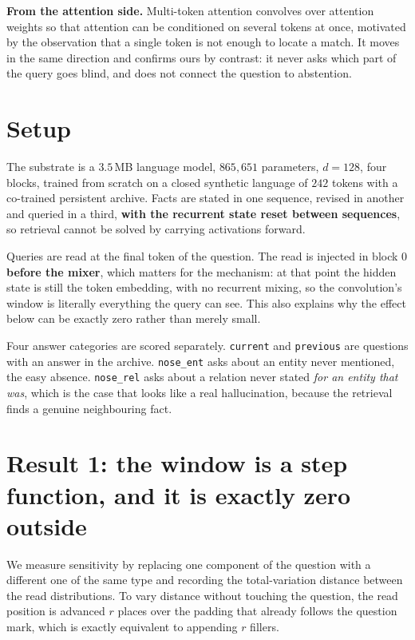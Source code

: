 \documentclass[11pt,a4paper]{article}
\begin{document}
\textbf{From the attention side.} Multi-token attention \citep{mta} convolves over attention weights so
that attention can be conditioned on several tokens at once, motivated by the observation that a single
token is not enough to locate a match. It moves in the same direction and confirms ours by contrast: it
never asks which part of the query goes blind, and does not connect the question to abstention.

\section{Setup}

The substrate is a $3.5$\,MB language model, $865{,}651$ parameters, $d=128$, four blocks, trained from
scratch on a closed synthetic language of $242$ tokens with a co-trained persistent archive. Facts are
stated in one sequence, revised in another and queried in a third, \textbf{with the recurrent state
reset between sequences}, so retrieval cannot be solved by carrying activations forward.

Queries are read at the final token of the question. The read is injected in block $0$
\textbf{before the mixer}, which matters for the mechanism: at that point the hidden state is still the
token embedding, with no recurrent mixing, so the convolution's window is literally everything the
query can see. This also explains why the effect below can be exactly zero rather than merely small.

Four answer categories are scored separately. \texttt{current} and \texttt{previous} are questions with
an answer in the archive. \texttt{nose\_ent} asks about an entity never mentioned, the easy absence.
\texttt{nose\_rel} asks about a relation never stated \emph{for an entity that was}, which is the case
that looks like a real hallucination, because the retrieval finds a genuine neighbouring fact.

\section{Result 1: the window is a step function, and it is exactly zero outside}

We measure sensitivity by replacing one component of the question with a different one of the same
type and recording the total-variation distance between the read distributions. To vary distance
without touching the question, the read position is advanced $r$ places over the padding that already
follows the question mark, which is exactly equivalent to appending $r$ fillers.
\end{document}

